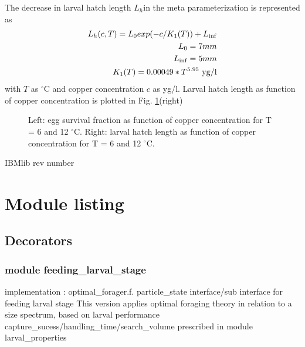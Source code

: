 The decrease in larval hatch length $L_h$in the meta parameterization is represented as 
\begin{eqnarray*}
 L_h(c,T) = L_0 exp(- c / K_1(T)) + L_{\inf}  \\
 L_0      = 7 mm \\
 L_{\inf}  = 5 mm \\
 K_1(T)   = 0.00049 * T^{5.95} {\ \rm yg/l} \\
\end{eqnarray*}
with $T$ as $^\circ$C and copper concentration $c$ as yg/l.
Larval hatch length as function of copper concentration is plotted in Fig. \ref{survANDhlen}(right)
\begin{figure}[p]   %
\begin{center}                                                 
\end{center}                                                    
\caption{Left: egg survival fraction as function of copper concentration for T = 6 and 12 $^\circ$C.
Right: larval hatch length as function of copper concentration for T = 6 and 12 $^\circ$C.}
\label{survANDhlen}
\end{figure}



IBMlib rev number



\section{Module listing } 

\subsection{Decorators} 

\subsubsection{module feeding\_larval\_stage}                                     
implementation : optimal\_forager.f.
particle\_state interface/sub interface for feeding larval stage  
This version applies optimal foraging theory in relation to a size spectrum, based
on larval performance capture\_sucess/handling\_time/search\_volume
prescribed in module larval\_properties 

